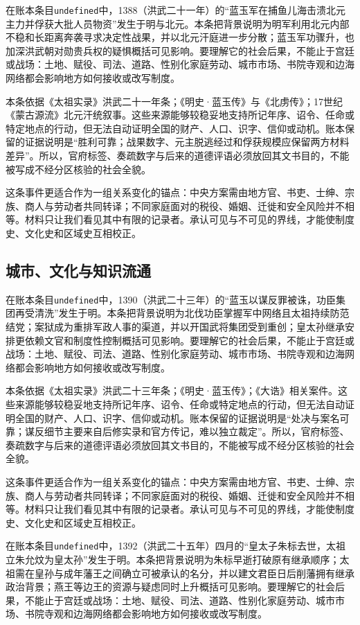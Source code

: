 在账本条目\texttt{undefined}中，1388（洪武二十一年）的“蓝玉军在捕鱼儿海击溃北元主力并俘获大批人员物资”发生于明与北元。本条把背景说明为明军利用北元内部不稳和长距离奔袭寻求决定性战果，并以北元汗庭进一步分散；蓝玉军功骤升，也加深洪武朝对勋贵兵权的疑惧概括可见影响。要理解它的社会后果，不能止于宫廷或战场：土地、赋役、司法、道路、性别化家庭劳动、城市市场、书院寺观和边海网络都会影响地方如何接收或改写制度。

本条依据《太祖实录》洪武二十一年条；《明史·蓝玉传》与《北虏传》；17世纪《蒙古源流》北元汗统叙事。这些来源能够较稳妥地支持所记年序、诏令、任命或特定地点的行动，但无法自动证明全国的财产、人口、识字、信仰或动机。账本保留的证据说明是“胜利可靠；战果数字、元主脱逃经过和俘获规模应保留两方材料差异”。所以，官府标签、奏疏数字与后来的道德评语必须放回其文书目的，不能被写成不经分区核验的社会全貌。

这条事件更适合作为一组关系变化的锚点：中央方案需由地方官、书吏、士绅、宗族、商人与劳动者共同转译；不同家庭面对的税役、婚姻、迁徙和安全风险并不相等。材料只让我们看见其中有限的记录者。承认可见与不可见的界线，才能使制度史、文化史和区域史互相校正。

\subsection{城市、文化与知识流通}

在账本条目\texttt{undefined}中，1390（洪武二十三年）的“蓝玉以谋反罪被诛，功臣集团再受清洗”发生于明。本条把背景说明为北伐功臣掌握军中网络且太祖持续防范结党；案狱成为重排军政人事的渠道，并以开国武将集团受到重创；皇太孙继承安排更依赖文官和制度性控制概括可见影响。要理解它的社会后果，不能止于宫廷或战场：土地、赋役、司法、道路、性别化家庭劳动、城市市场、书院寺观和边海网络都会影响地方如何接收或改写制度。

本条依据《太祖实录》洪武二十三年条；《明史·蓝玉传》；《大诰》相关案件。这些来源能够较稳妥地支持所记年序、诏令、任命或特定地点的行动，但无法自动证明全国的财产、人口、识字、信仰或动机。账本保留的证据说明是“处决与案名可靠；谋反细节主要来自后修实录和官方传记，难以独立裁定”。所以，官府标签、奏疏数字与后来的道德评语必须放回其文书目的，不能被写成不经分区核验的社会全貌。

这条事件更适合作为一组关系变化的锚点：中央方案需由地方官、书吏、士绅、宗族、商人与劳动者共同转译；不同家庭面对的税役、婚姻、迁徙和安全风险并不相等。材料只让我们看见其中有限的记录者。承认可见与不可见的界线，才能使制度史、文化史和区域史互相校正。

在账本条目\texttt{undefined}中，1392（洪武二十五年）四月的“皇太子朱标去世，太祖立朱允炆为皇太孙”发生于明。本条把背景说明为朱标早逝打破原有继承顺序；太祖需在皇孙与成年藩王之间确立可被承认的名分，并以建文君臣日后削藩拥有继承政治背景；燕王等边王的资源与疑虑同时上升概括可见影响。要理解它的社会后果，不能止于宫廷或战场：土地、赋役、司法、道路、性别化家庭劳动、城市市场、书院寺观和边海网络都会影响地方如何接收或改写制度。

